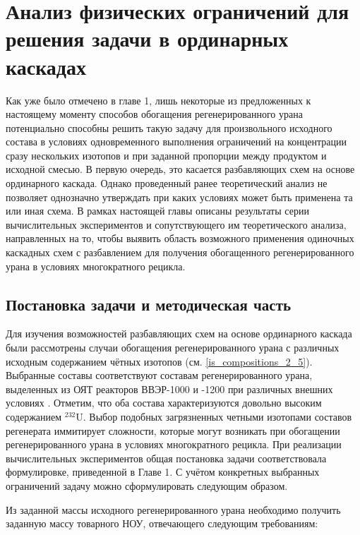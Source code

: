 \chapter{Анализ физических ограничений для решения задачи в ординарных каскадах}\label{ch:ch2}

Как уже было отмечено в главе 1, лишь некоторые из предложенных к настоящему моменту способов обогащения регенерированного урана потенциально способны решить такую задачу для произвольного исходного состава в условиях одновременного выполнения ограничений на концентрации сразу нескольких изотопов и при заданной пропорции между продуктом и исходной смесью. В первую очередь, это касается разбавляющих схем на основе ординарного каскада. 
Однако проведенный ранее теоретический анализ не позволяет однозначно утверждать при каких условиях может быть применена та или иная схема. В рамках настоящей главы описаны результаты серии вычислительных экспериментов и сопутствующего им теоретического анализа, направленных на то, чтобы выявить область возможного применения одиночных каскадных схем с разбавлением для получения обогащенного регенерированного урана в условиях многократного рецикла. 


\section{Постановка задачи и методическая часть}

Для изучения возможностей разбавляющих схем на основе ординарного каскада были рассмотрены случаи обогащения регенерированного урана с различных исходным содержанием чётных изотопов (см. \ref{is_compositions_2_5}). Выбранные составы соответствуют составам регенерированного урана, выделенных из ОЯТ реакторов ВВЭР-1000 и -1200 при различных внешних условиях \cite{palkinDesignanalyticalResearchRefinement2010,nevinicaToplivnyyCiklLegkovodnogo2019}. Отметим, что оба состава характеризуются довольно высоким содержанием $^{232}$U. Выбор подобных загрязненных четными изотопами составов регенерата иммитирует сложности, которые могут возникать при обогащении регенерированного урана в условиях многократного рецикла.  
При реализации вычислительных экспериментов общая постановка задачи соответствовала формулировке, приведенной в Главе 1. С учётом конкретных выбранных ограничений задачу можно сформулировать следующим образом.

Из заданной массы исходного регенерированного урана необходимо получить заданную массу товарного НОУ, отвечающего следующим требованиям:

